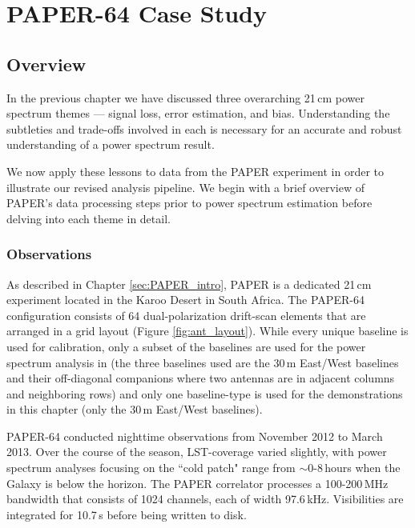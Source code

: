 
\chapter{PAPER-64 Case Study}
\label{c.PSA64}


\section{Overview}
\label{sec:PSA64overview}

In the previous chapter we have discussed three overarching 21\,cm power spectrum themes --- signal loss, error estimation, 
and bias. Understanding the subtleties and trade-offs involved in each is necessary for an accurate and robust understanding of 
a power spectrum result. 

We now apply these lessons to data from the PAPER experiment in order to illustrate our revised analysis pipeline. We begin with a brief overview of PAPER's data processing steps prior to power spectrum estimation before delving into each theme in detail.

\subsection{Observations}

As described in Chapter \ref{sec:PAPER_intro}, PAPER is a dedicated 21\,cm experiment located in the Karoo Desert in South Africa. The PAPER-64 configuration consists of 64 dual-polarization drift-scan elements that are arranged in a grid layout (Figure \ref{fig:ant_layout}). While every unique baseline is used for calibration, only a subset of the baselines are used for the power spectrum analysis in  (the three baselines used are the $30$\,m East/West baselines and their off-diagonal companions where two antennas are in adjacent columns and neighboring rows) and only one baseline-type is used for the demonstrations in this chapter (only the $30$\,m East/West baselines).

PAPER-64 conducted nighttime observations from November 2012 to March 2013. Over the course of the season, LST-coverage varied slightly, with power spectrum analyses focusing on the ``cold patch" range from $\sim0$-$8$\,hours when the Galaxy is below the horizon. The PAPER correlator processes a 100-200\,MHz bandwidth that consists of 1024 channels, each of width 97.6\,kHz. Visibilities are integrated for 10.7\,s before being written to disk. 


